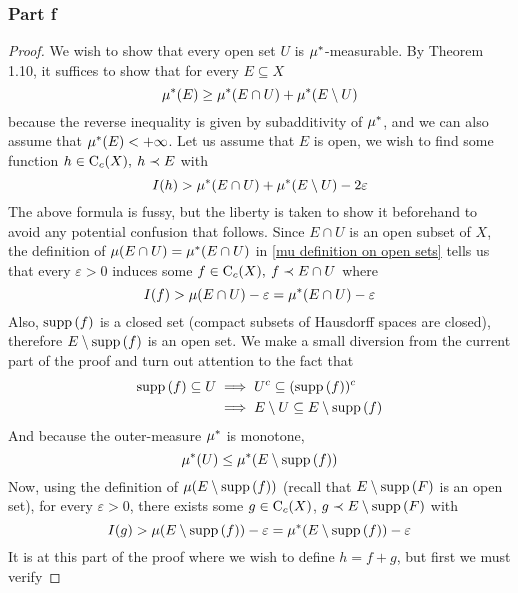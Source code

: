 \documentclass[../../main.tex]{subfiles}
\begin{document}
\subsubsection*{Part f}
\begin{proof}
We wish to show that every open set $U$ is $\mu^*$-measurable. By Theorem 1.10, it suffices to show that for every $E\subseteq X$
\begin{equation}\label{mustar measurable}
\mu^*(E) \geq \mu^*(E\cap U) +\mu^*(E\setminus U)
\end{equation}
because the reverse inequality is given by subadditivity of $\mu^*$, and we can also assume that $\mu^*(E)<+\infty$. Let us assume that $E$ is open, we wish to find some function $h\in\operatorname{C}_c({X}),\: h\prec E$ with
\[
I(h)> \mu^*(E\cap U) + \mu^*(E\setminus U) - 2\varepsilon
\]
The above formula is fussy, but the liberty is taken to show it beforehand to avoid any potential confusion that follows. Since $E\cap U$ is an open subset of $X$, the definition of $\mu(E\cap U) = \mu^*(E\cap U)$ in \eqref{mu definition on open sets} tells us that every $\varepsilon>0$ induces some $f\in\operatorname{C}_c({X}),\:f\prec E\cap U$ where
\begin{equation}\label{If part f}
    I(f)>\mu(E\cap U)-\varepsilon=\mu^*(E\cap U)-\varepsilon
\end{equation}
Also, $\operatorname{supp}{(f)}$ is a closed set (compact subsets of Hausdorff spaces are closed), therefore $E\setminus\operatorname{supp}{(f)}$ is an open set. We make a small diversion from the current part of the proof and turn out attention to the fact that
\begin{align*}
    \operatorname{supp}{(f)}\subseteq U&\implies U^c\subseteq (\operatorname{supp}{(f)})^c\\
    &\implies E\setminus U\subseteq E\setminus\operatorname{supp}{(f)}
\end{align*}
And because the outer-measure $\mu^*$ is monotone,
\begin{equation}\label{mustar motone part f Esuppf}
    \mu^*(U)\leq \mu^*(E\setminus \operatorname{supp}{(f)})
\end{equation}
Now, using the definition of $\mu(E\setminus\operatorname{supp}{(f)})$ (recall that $E\setminus\operatorname{supp}{(F)}$ is an open set), for every $\varepsilon>0$, there exists some $g\in\operatorname{C}_c({X})$, $g\prec E\setminus\operatorname{supp}{(F)}$ with
\begin{equation}\label{Ig part f}
I(g)>\mu(E\setminus \operatorname{supp}{(f)})-\varepsilon =\mu^*(E\setminus \operatorname{supp}{(f)})-\varepsilon
\end{equation}
It is at this part of the proof where we wish to define $h=f+g$, but first we must verify

\end{proof}
\end{document}
